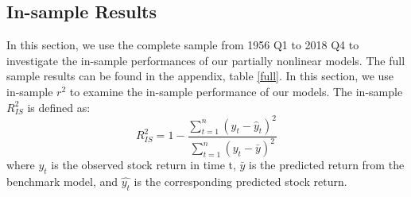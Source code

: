 \documentclass[a4paper,12pt,times,numbered,print,index]{report}
\numberwithin{equation}{section}
\begin{document}






\subsection{In-sample Results}
In this section, we use the complete sample from 1956 Q1 to 2018 Q4 to investigate the in-sample performances of our partially nonlinear models. The full sample results can be found in the appendix, table \ref{full}. In this section, we use in-sample $r^2$ to examine the in-sample performance of our models.
The in-sample $R^2_{IS}$ is defined as:
\begin{equation}
	R_{IS}^{2}=1-\frac{\sum_{t=1}^{n}\left(y_{t}-\widehat{y}_{t}\right)^{2}}{\sum_{t=1}^{n}\left(y_{t}-\bar{y}\right)^{2}}
\end{equation}
where $y_t$ is the observed stock return in time t, $\bar{y}$ is the predicted return from the benchmark model, and $\hat{y_{t}}$ is the corresponding predicted stock return. 
\end{document}

